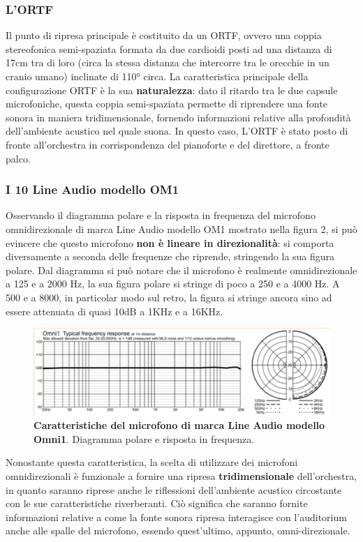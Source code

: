 	\subsubsection{L'ORTF}
	Il punto di ripresa principale è costituito da un ORTF, ovvero una coppia stereofonica semi-spaziata formata da due cardioidi posti ad una distanza di 17cm tra di loro (circa la stessa distanza che intercorre tra le orecchie in un cranio umano) inclinate di 110° circa.
	La caratteristica principale della configurazione ORTF è la sua \textbf{naturalezza}: dato il ritardo tra le due capsule microfoniche, questa coppia semi-spaziata permette di riprendere una fonte sonora in maniera tridimensionale, fornendo informazioni relative alla profondità dell'ambiente acustico nel quale suona.
	In questo caso, L'ORTF è stato posto di fronte all'orchestra in corrispondenza del pianoforte e del direttore, a fronte palco.
	
	\subsubsection{I 10 Line Audio modello OM1}
	Osservando il diagramma polare e la risposta in frequenza del microfono omnidirezionale di marca Line Audio modello OM1 mostrato nella figura 2, si può evincere che questo microfono \textbf{non è lineare in direzionalità}: si comporta diversamente a seconda delle frequenze che riprende, stringendo la sua figura polare. Dal diagramma si può notare che il microfono è realmente omnidirezionale a 125 e a 2000 Hz, la sua figura polare si stringe di poco a 250 e a 4000 Hz. A 500 e a 8000, in particolar modo sul retro, la figura si stringe ancora sino ad essere attenuata di quasi 10dB a 1KHz e a 16KHz.
	
	\begin{figure}[h]
		\begin{center}
			\includegraphics[width=.47\textwidth]{img/image1.png}
			\caption{\textbf{Caratteristiche del microfono di marca Line Audio modello Omni1}. Diagramma polare e risposta in frequenza.}
			\label{gr01}
		\end{center}
	\end{figure}
	
	Nonostante questa caratteristica, la scelta di utilizzare dei microfoni omnidirezionali è funzionale a fornire una ripresa \textbf{tridimensionale} dell'orchestra, in quanto saranno riprese anche le riflessioni dell'ambiente acustico circostante con le sue caratteristiche riverberanti. Ciò significa che saranno fornite informazioni relative a come la fonte sonora ripresa interagisce con l'auditorium anche alle spalle del microfono, essendo quest'ultimo, appunto, omni-direzionale.
	
